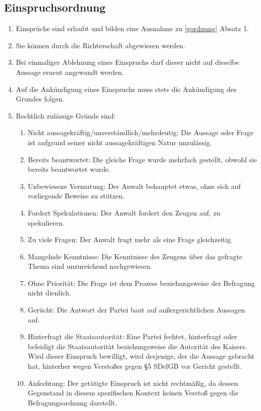\documentclass{article}
\begin{document}
\subsection{Einspruchsordnung}\label{eordnung}
\begin{enumerate}[(1)]
    \item Einsprüche sind erlaubt und bilden eine Ausnahme zu \ref{gordnung} Absatz 1.
    \item Sie können durch die Richterschaft abgewiesen werden.
    \item Bei einmaliger Ablehnung eines Einspruchs darf dieser nicht auf dieselbe Aussage erneut angewandt werden.
    \item Auf die Ankündigung eines Einspruchs muss stets die Ankündigung des Grundes folgen.
    \item Rechtlich zulässige Gründe sind:
        \begin{enumerate}[1.]
            \item Nicht aussagekräftig/unverständlich/mehrdeutig: Die Aussage oder Frage ist aufgrund seiner nicht aussagekräftigen Natur unzulässig.
            \item Bereits beantwortet: Die gleiche Frage wurde mehrfach gestellt, obwohl sie bereits beantwortet wurde.
            \item Unbewiesene Vermutung: Der Anwalt behauptet etwas, ohne sich auf vorliegende Beweise zu stützen.
            \item Fordert Spekulationen: Der Anwalt fordert den Zeugen auf, zu spekulieren.
            \item Zu viele Fragen: Der Anwalt fragt mehr als eine Frage gleichzeitig.
            \item Mangelnde Kenntnisse: Die Kenntnisse des Zeugens über das gefragte Thema sind unzureichend nachgewiesen.
            \item Ohne Priorität: Die Frage ist dem Prozess beziehungsweise der Befragung nicht dienlich.
            \item Gerücht: Die Antwort der Partei baut auf außergerichtlichen Aussagen auf.
            \item Hinterfragt die Staatsautorität: Eine Partei fechtet, hinterfragt oder beleidigt die Staatsautorität beziehungsweise die Autorität des Kaisers. Wird dieser Einspruch bewilligt, wird derjenige, der die Aussage gebracht hat, hinterher wegen Verstoßes gegen §5 SDelGB vor Gericht gestellt.
            \item Anfechtung: Der getätigte Einspruch ist nicht rechtmäßig, da dessen Gegenstand in diesem spezifischen Kontext keinen Verstoß gegen die Befragungsordnung darstellt.

\end{enumerate}
\end{enumerate}
\end{document}
